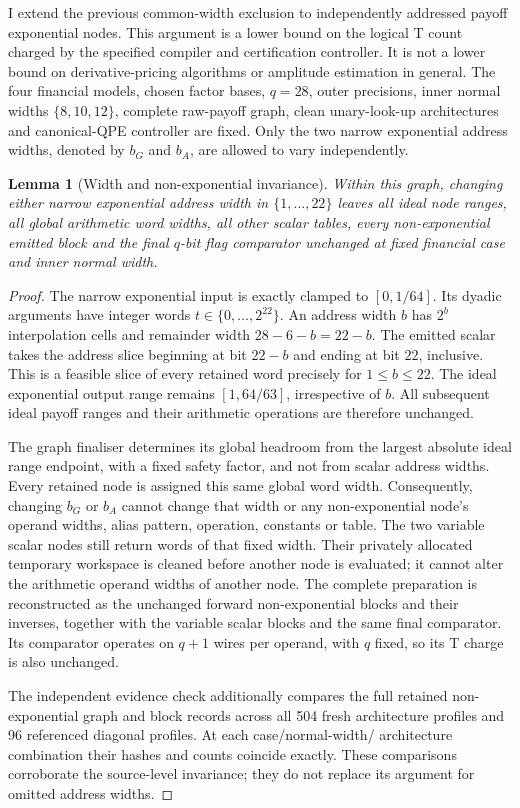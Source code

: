 \documentclass[11pt]{article}
\newtheorem{lemma}[theorem]{Lemma}
\begin{document}
I extend the previous common-width exclusion to independently addressed
payoff exponential nodes. This argument is a lower bound on the logical
T count charged by the specified compiler and certification controller.
It is not a lower bound on derivative-pricing algorithms or amplitude
estimation in general. The four financial models, chosen factor bases,
$q=28$, outer precisions, inner normal widths $\{8,10,12\}$, complete
raw-payoff graph, clean unary-look-up architectures and canonical-QPE
controller are fixed. Only the two narrow exponential address widths,
denoted by $b_G$ and $b_A$, are allowed to vary independently.

\begin{lemma}[Width and non-exponential invariance]
\label{lem:raw-asymmetric-fixed-width}
Within this graph, changing either narrow exponential address width in
$\{1,\ldots,22\}$ leaves all ideal node ranges, all global arithmetic
word widths, all other scalar tables, every non-exponential emitted block
and the final $q$-bit flag comparator unchanged at fixed financial case
and inner normal width.
\end{lemma}
\begin{proof}
The narrow exponential input is exactly clamped to $[0,1/64]$. Its
dyadic arguments have integer words $t\in\{0,\ldots,2^{22}\}$.
An address width $b$ has $2^b$ interpolation cells and remainder width
$28-6-b=22-b$. The emitted scalar takes the address slice beginning
at bit $22-b$ and ending at bit $22$, inclusive. This is a feasible
slice of every retained word precisely for $1\leq b\leq22$.
The ideal exponential output range remains $[1,64/63]$, irrespective
of $b$. All subsequent ideal payoff ranges and their arithmetic
operations are therefore unchanged.

The graph finaliser determines its global headroom from the largest
absolute ideal range endpoint, with a fixed safety factor, and not from
scalar address widths. Every retained node is assigned this same global
word width. Consequently, changing $b_G$ or $b_A$ cannot change that
width or any non-exponential node's operand widths, alias pattern,
operation, constants or table. The two variable scalar nodes still
return words of that fixed width. Their privately allocated temporary
workspace is cleaned before another node is evaluated; it cannot alter
the arithmetic operand widths of another node. The complete preparation
is reconstructed as the unchanged forward non-exponential blocks and
their inverses, together with the variable scalar blocks and the same
final comparator. Its comparator operates on $q+1$ wires per operand,
with $q$ fixed, so its T charge is also unchanged.

The independent evidence check additionally compares the full retained
non-exponential graph and block records across all 504 fresh architecture
profiles and 96 referenced diagonal profiles. At each case/normal-width/
architecture combination their hashes and counts coincide exactly.
These comparisons corroborate the source-level invariance; they do not
replace its argument for omitted address widths.
\end{proof}
\end{document}
